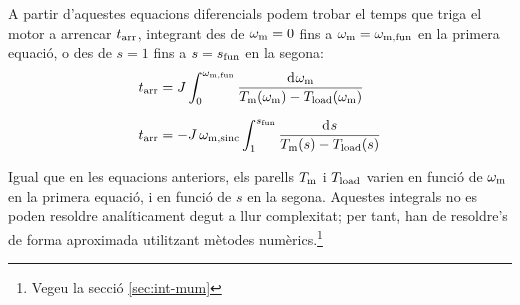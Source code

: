 A partir d'aquestes equacions diferencials podem trobar el temps que triga el motor a arrencar $t_\mathrm{arr}$, integrant des de $\omega_\mathrm{m}=0$ fins a $\omega_\mathrm{m}=\omega_\mathrm{m,fun}$ en la primera equació, o des de $s = 1$ fins a $s = s_\mathrm{fun}$ en la segona:
\begin{subequations}
\begin{align}
    t\ped{arr} &= J\int_{0}^{\omega\ped{m,fun}} \frac{\diff\omega\ped{m}}{T\ped{m}(\omega\ped{m})-T\ped{load}(\omega\ped{m})}\label{eq:tarr-mot}\\[1.5ex]
    t\ped{arr} &= - J\,\omega\ped{m,sinc} \int_{1}^{s\ped{fun}} \frac{\diff s}{T\ped{m}(s)-T\ped{load}(s)}
\end{align}
\end{subequations}

Igual que en les equacions anteriors, els parells $T_\mathrm{m}$ i $T_\mathrm{load}$ varien en funció de $\omega_\mathrm{m}$ en la primera equació, i en funció de $s$ en la segona. Aquestes integrals no es poden  resoldre  analíticament degut a llur complexitat; per tant,  han de resoldre's de forma aproximada utilitzant mètodes numèrics.\footnote{Vegeu la secció \ref{sec:int-mum}}


